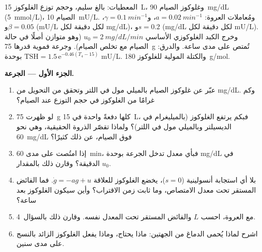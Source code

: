 \begin{problem}
\label{pb:b3:endocrinology:1}
المعطيات: بالغ سليم، وحجم توزع الغلوكوز \qty{15}{L}، وغلوكوز
الصيام \qty{90}{mg/dL} (\qty{5}{mmol/L})،  الصيام
\qty{10}{mU/L}. ومُعاملات العروة: $a = \qty{0.02}{min^{-1}}$، و$\gamma =
\qty{0.1}{min^{-1}}$، و$\beta = 0.05$ (mU/L لكل دقيقة لكل mg/dL)، و$s = 0.2$
(mg/dL لكل دقيقة لكل mU/L). وخرج الكبد الغلوكوزي الأساسي $u_{0} =
\qty{2}{mg/dL/min}$ (وهو متوازن أصلًا في حالة الصيام مع تخلص
الصيام). وجرعة فموية قدرها \qty{75}{g} تُمتص على مدى ساعة.
والدرق: $\text{TSH} = 1.5\,\mathrm{e}^{-0.46(T_{4} - 15)}$ بوحدة mU/L.
والكتلة المولية للغلوكوز \qty{180}{g/mol}.

\medskip
\noindent\textbf{الجزء الأول --- الجرعة.}
\begin{enumerate}
  \item عبّر عن غلوكوز الصيام بالميلي مول في اللتر وتحقق من
        التحويل من mg/dL. وكم غرامًا من الغلوكوز في حجم التوزع عند
        الصيام؟
  \item لو ظهرت \qty{75}{g} كلها دفعةً واحدة في \qty{15}{L}،
        فبكم يرتفع الغلوكوز (بالميليغرام في الديسيلتر وبالميلي
        مول في اللتر)؟
        ولماذا تقصّر الذروة الحقيقية، وهي نحو \qty{60}{mg/dL}
        فوق الصيام، عن ذلك كثيرًا؟
  \item إذا امتُصت على مدى \qty{60}{min}، فبأي معدل تدخل
        الجرعة بوحدة mg/dL في الدقيقة؟ وقارن ذلك بالمقدار
        $u_{0}$.
  \item بلا أي استجابة أنسولينية ($s = 0$)، يخضع الغلوكوز
        للعلاقة $\dot
        g = -a g + u$. فما الفائض المستقر تحت
        معدل الامتصاص، وما ثابت زمن الاقتراب؟ وأين سيكون
        الغلوكوز بعد ساعة؟
  \item مع العروة، احسب $L$ والفائض المستقر تحت المعدل نفسه.
        وقارن ذلك بالسؤال~4.
  \item اشرح لماذا يُحمى الدماغ من الجهتين: ماذا يحتاج،
        وماذا يفعل الغلوكوز الزائد بالنسج على مدى سنين.
\end{enumerate}


\end{problem}
